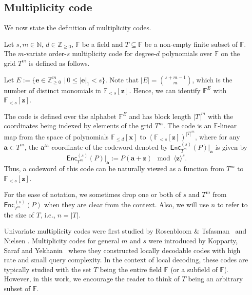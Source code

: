 \documentclass{article}
\def\Integer{\mathbb{Z}}
\def\Natural{\mathbb{N}}
\def\Field{\mathbb{F}}
\let\N\Natural
\let\Z\Integer
\let\F\Field
\def\veca{\mathbf{a}}
\def\vece{\mathbf{e}}
\def\vecx{\mathbf{x}}
\def\vecz{\mathbf{z}}
\newcommand{\enc}{{\mathsf{Enc}}}
\newcommand{\encst}{{\mathsf{Enc}_{T^m}^{(s)}}}
\newcommand{\vz}{\vecz}
\newcommand{\vx}{\vecx}
\newcommand{\ve}{\vece}
\newcommand{\va}{\veca}
\begin{document}
	
	\subsection{Multiplicity code}\label{sec:mult}
	We now state the definition of multiplicity codes. 
	\begin{definition}\label{def:multiplicity code}
		Let $s, m \in \N$, $d \in \Z_{\geq 0}$, $\F$ be a field and $T \subseteq \F$ be a non-empty finite subset of $\F$. The $m$-variate order-$s$ multiplicity code for degree-$d$ polynomials over $\F$ on the grid $T^m$ is defined as follows.
		
		Let
		$E := \{\ve \in \Z_{\geq 0}^m \mid 0 \leq |\ve |_1 <
		s\}$.  Note that
		$|E| = \binom{s+ m -1}{m}$, which is the number of distinct
		monomials in $\F_{<s}[\vz]$. Hence, we can identify $\F^E$ with
		$\F_{<s}[\vz]$.
		
		The code is defined over the alphabet $\F^E$ and has block length $|T|^m$ with the coordinates being indexed by elements of the grid $T^m$. The code is an $\F$-linear map from  the space of polynomials $\F_{\leq d}[\vx]$ to $\left(\F_{< s}[\vz]\right)^{|T|^m}$, where for any $\va \in T^m$, the $\va^{th}$ coordinate of the codeword denoted by $\enc_{T^m}^{(s)}(P)|_{\va}$ is given by
		\[
		\enc_{T^m}^{(s)}(P)|_{\va} := P(\va + \vz) \mod \langle \vz \rangle^s. 
		\] 
		Thus, a codeword of this code can be naturally viewed as a function from $T^m$ to $\F_{<s}[\vz]$. 
	\end{definition}
	
	
	\begin{remark}\label{rmk: notation enc}
		For the ease of notation, we sometimes drop one or both of $s$ and
		$T^m$ from $\encst(P)$ when they are clear from the context. Also, we
		will use $n$ to refer to the size of $T$, i.e., $n= |T|$.
	\end{remark}
	
	Univariate multiplicity codes were first studied by Rosenbloom \&
	Tsfasman~\cite{RosenbloomT1997} and Nielsen
	\cite{Nielsen2001}. Multiplicity codes for general $m$ and $s$ were
	introduced by Kopparty, Saraf and Yekhanin~\cite{KoppartySY2014} where 
	they constructed locally decodable codes with high rate and small
	query complexity. In the context of local decoding, these codes are
	typically studied with the set $T$ being the entire field $\F$ (or a subfield of $\F$). However,
	in this work, we encourage the reader to think of $T$ being an
	arbitrary subset of $\F$.
	
\end{document}
